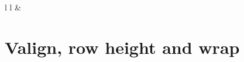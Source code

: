 \documentclass[]{article}
\begin{document}
\begin{table}[ht]
\begin{centerbox}
\begin{threeparttable}
\begin{tabular}{l l}
 &
 \tabularnewline[-0.5pt]


\end{tabular}
\end{threeparttable}\par\end{centerbox}

\end{table}
 

\FloatBarrier

\hypertarget{valign-row-height-and-wrap}{%
\section{Valign, row height and wrap}\label{valign-row-height-and-wrap}}

 
  \providecommand{\huxb}[2]{\arrayrulecolor[RGB]{#1}\global\arrayrulewidth=#2pt}
  \providecommand{\huxvb}[2]{\color[RGB]{#1}\vrule width #2pt}
  \providecommand{\huxtpad}[1]{\rule{0pt}{#1}}
  \providecommand{\huxbpad}[1]{\rule[-#1]{0pt}{#1}}
\end{document}
